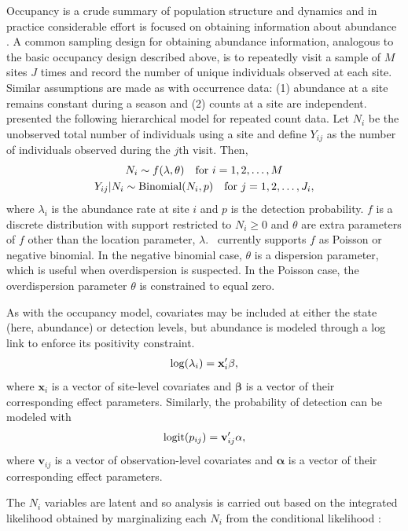 \documentclass[article,shortnames]{jss}
\DeclareMathOperator{\logit}{logit}
\DeclareMathOperator{\Bin}{Binomial}
\newcommand{\um}{\pkg{unmarked}}
\begin{document}
Occupancy is a crude summary of population structure and dynamics and in
practice considerable effort is focused on obtaining information about
abundance \citep{dorazio07}. A common sampling design for obtaining
abundance information,
analogous to the basic occupancy design described above, is to
repeatedly visit a sample of $M$ sites $J$ times and
record the number of unique individuals observed at each site.
Similar assumptions are made as with occurrence data: (1) abundance at
a site remains constant during a season and (2) counts at a site are
independent.  \citet{Royle2004} presented the following hierarchical model for
repeated count data.  Let $N_i$ be the unobserved total number of
individuals using a site and define $Y_{ij}$ as the number of individuals
observed during the $j$th visit.  Then,
\begin{gather}
\label{eq:pc2}
  N_i \sim f(\lambda, \theta) \text{\quad for $i=1,2,\dots,M$}  \notag\\
  Y_{ij}|N_{i} \sim \Bin(N_i, p)\text{\quad for $j=1,2,\dots,J_{i}$} \notag,
\end{gather}
where $\lambda_i$ is the abundance rate at site $i$ and $p$ is
the detection probability.  $f$ is
a discrete distribution with support restricted to $N_{i} \ge 0$ and
$\theta$ are extra parameters of $f$ other than the location
parameter, $\lambda$.  \um\ currently supports $f$ as Poisson or
negative binomial.  In the
negative binomial case, $\theta$ is a dispersion parameter, which is
useful when overdispersion is suspected. In the Poisson case,
the overdispersion parameter $\theta$ is constrained to equal zero.

As with the occupancy model, covariates may be included at either the
state (here, abundance) or detection levels, but abundance is modeled
through a log link to enforce its positivity constraint.
\begin{gather}
  \log(\lambda_i) = \mathbf x_i' \mathbf \beta, \notag
\end{gather}
where $\mathbf x_i$ is a vector of site-level covariates and $\mathbf \beta$
is a vector of their corresponding effect parameters.  Similarly, the
probability of detection can be modeled with
\begin{gather}
  \logit(p_{ij}) = \mathbf v_{ij}' \mathbf \alpha, \notag
\end{gather}
where $\mathbf v_{ij}$ is a vector of observation-level covariates and
$\mathbf \alpha$ is a vector of their corresponding effect parameters.

The $N_{i}$ variables are latent and so analysis is carried out based on
the integrated likelihood obtained by marginalizing each $N_{i}$ from the
conditional likelihood \citep{Royle2004b}:
\end{document}
